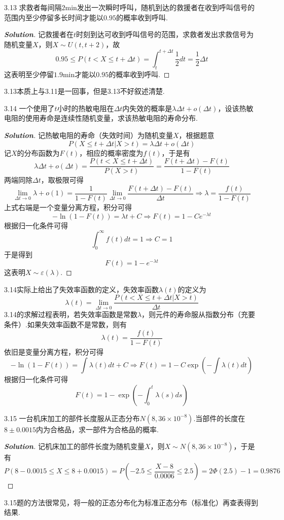 \documentclass[10pt, a4paper, oneside]{ctexart}
\newenvironment{solution}{\begin{proof}[\bf Solution]}{\end{proof}}
\begin{document}
\newpage

3.13 求救者每间隔$2$min发出一次瞬时呼叫，随机到达的救援者在收到呼叫信号的范围内至少停留多长时间才能以$0.95$的概率收到呼叫.
\begin{solution}
记救援者在$t$时刻到达可收到呼叫信号的范围，求救者发出求救信号为随机变量$X$，则$X\sim U(t,t+2)$，故
\[0.95 \leqslant P(t < X \leqslant t + \Delta t) = \int_t^{t + \Delta t} {\frac{1}{2}dt}  = \frac{1}{2}\Delta t\]
这表明至少停留$1.9$min才能以$0.95$的概率收到呼叫.
\end{solution}
\begin{remark}
3.13本质上与3.11是一回事，但是3.13不好叙述清楚.
\end{remark}

3.14 一个使用了$t$小时的热敏电阻在$\Delta t$内失效的概率是$\lambda \Delta t+o(\Delta t)$，设该热敏电阻的使用寿命是连续性随机变量，求该热敏电阻的寿命分布.
\begin{solution}
记热敏电阻的寿命（失效时间）为随机变量$X$，根据题意
\[P(X \leqslant t + \Delta t|X > t) = \lambda \Delta t + o(\Delta t)\]
记$X$的分布函数为$F(t)$，相应的概率密度为$f(t)$，于是有
\[\lambda \Delta t + o(\Delta t) = \frac{{P(t < X \leqslant t + \Delta t)}}{{P(X > t)}} = \frac{{F(t + \Delta t) - F(t)}}{{1 - F(t)}}\]
两端同除$\Delta t$，取极限可得
\[\mathop {\lim }\limits_{\Delta t \to 0} \lambda  + o(1) = \frac{1}{{1 - F(t)}}\mathop {\lim }\limits_{\Delta t \to 0} \frac{{F(t + \Delta t) - F(t)}}{{\Delta t}} \Rightarrow \lambda  = \frac{{f(t)}}{{1 - F(t)}}\]
上式右端是一个变量分离方程，积分可得
\[ - \ln (1 - F(t)) = \lambda t + C \Rightarrow F(t) = 1 - C{e^{ - \lambda t}}\]
根据归一化条件可得
\[\int_0^\infty  {f(t)dt}  = 1 \Rightarrow C = 1\]
于是得到
\[F(t) = 1 - {e^{ - \lambda t}}\]
这表明$X\sim \varepsilon(\lambda)$.
\end{solution}
\begin{remark}
3.14实际上给出了失效率函数的定义，失效率函数$\lambda(t)$的定义为
\[\lambda (t) = \mathop {\lim }\limits_{\Delta t \to 0} \frac{{P(t < X \leqslant t + \Delta t|X > t)}}{{\Delta t}}\]
3.14的求解过程表明，若失效率函数是常数$\lambda$，则元件的寿命服从指数分布（充要条件）.如果失效率函数不是常数，则有
 \[
   \lambda(t)=\frac{f(t)}{1-F(t)}
   \]
依旧是变量分离方程，积分可得
\[ - \ln (1 - F(t)) = \int {\lambda (t)dt}  + C \Rightarrow F(t) = 1 - C\exp ( - \int {\lambda (t)dt} )\]
根据归一化条件可得
\[F(t) = 1 - \exp ( - \int_0^t {\lambda (s)ds} )\]
\end{remark}

3.15 一台机床加工的部件长度服从正态分布$N(8,36\times 10^{-8})$.当部件的长度在$8\pm 0.0015$内为合格品，求一部件为合格品的概率.
\begin{solution}
记机床加工的部件长度为随机变量$X$，则$X\sim N(8,36\times 10^{-8})$，于是有
\[P(8 - 0.0015 \leqslant X \leqslant 8 + 0.0015) = P( - 2.5 \leqslant \frac{{X - 8}}{{0.0006}} \leqslant 2.5) = 2\Phi (2.5) - 1 = 0.9876\]
\end{solution}
\begin{remark}
3.15题的方法很常见，将一般的正态分布化为标准正态分布（标准化）再查表得到结果.
\end{remark}
\end{document}
